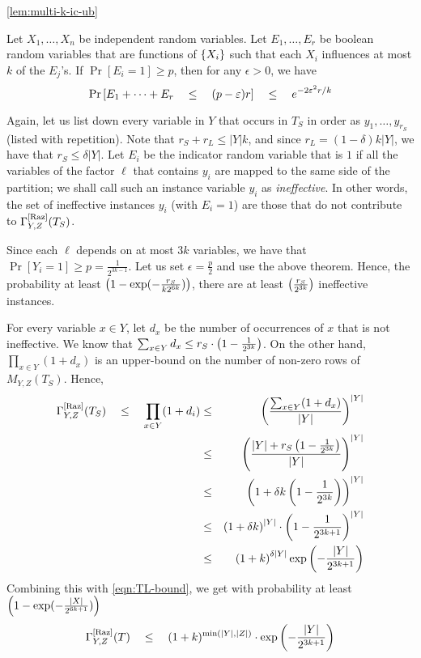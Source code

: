 \begin{proofof}{\autoref{lem:multi-k-ic-ub}}
\begin{theorem}
Let $X_1,\dots, X_n$ be independent random variables. 
Let $E_1,\dots, E_r$ be boolean random variables that are functions of $\left\{X_i\right\}$ such that each $X_i$ influences at most $k$ of the $E_j$'s. 
If $\Pr[E_i = 1] \geq p$, then for any $\epsilon > 0$, we have
\[
\Pr\left[E_1 + \dots + E_r  \quad \leq \quad (p - \varepsilon) r \right] \quad \leq \quad e^{-2\varepsilon^2 r/k}
\]
\end{theorem}

Again, let us list down every variable in $Y$ that occurs in $T_S$ in order as $y_1,\dots, y_{r_S}$ (listed with repetition). 
Note that $r_S + r_L \leq |Y|k$, and since $r_L = (1-\delta)k|Y|$,  we have that $r_S \leq \delta |Y|$. 
Let $E_i$ be the indicator random variable that is $1$ if all the variables of the factor  $\ell$ that contains $y_i$ are mapped to the same side of the partition; we shall call such an instance variable $y_i$ as \emph{ineffective}. 
In other words, the set of ineffective instances $y_i$ (with $E_i = 1$) are those that do not contribute to $\Gamma^{\mathrm{[Raz]}}_{Y,Z}(T_S)$. 

Since each $\ell$ depends on at most $3k$ variables, we have that $\Pr[Y_i = 1] \geq  p= \frac{1}{2^{3k-1}}$. 
Let us set $\epsilon = \frac{p}{2}$ and use the above theorem. 
Hence, the probability at least $\left(1 - \exp(-\frac{r_S}{k2^{6k}})\right)$, there are at least $\left(\frac{r_S}{2^{3k}}\right)$ ineffective instances. 

For every variable $x \in Y$, let $d_x$ be the number of occurrences of $x$ that is not ineffective. 
We know that $\sum_{x\in Y} d_x \leq r_S \cdot \left(1 - \frac{1}{2^{3k}}\right)$. 
On the other hand, $\prod_{x\in Y} (1 + d_x)$ is an upper-bound on the number of non-zero rows of $M_{Y,Z}(T_S)$. 
Hence,
\begin{eqnarray*}
\Gamma^{\mathrm{[Raz]}}_{Y,Z}(T_S) \quad \leq \quad\prod_{x\in Y} (1 + d_i) & \leq & \left(\frac{\sum_{x\in Y} (1 + d_x)}{|Y|}\right)^{|Y|}\\
 & \leq & \left(\frac{|Y| + r_S \left(1 - \frac{1}{2^{3k}}\right)}{|Y|}\right)^{|Y|}\\
 & \leq & \left(1 + \delta k\left(1 - \frac{1}{2^{3k}}\right)\right)^{|Y|}\\
 & \leq & \left(1+\delta k\right)^{|Y|} \cdot \left(1 - \frac{1}{2^{3k+1}}\right)^{|Y|}\\
 & \leq & \left(1+k\right)^{\delta |Y|}\exp\left(-\frac{|Y|}{2^{3k+1}}\right)
\end{eqnarray*}
Combining this with \eqref{eqn:TL-bound}, we get with probability at least $\left(1 - \exp(-\frac{|X|}{2^{6k+1}})\right)$
\[
\Gamma^{\mathrm{[Raz]}}_{Y,Z}(T) \quad \leq \quad (1+k)^{\min(|Y|,|Z|)}\cdot \exp\left(-\frac{|Y|}{2^{3k+1}}\right)
\]
\end{proofof}

